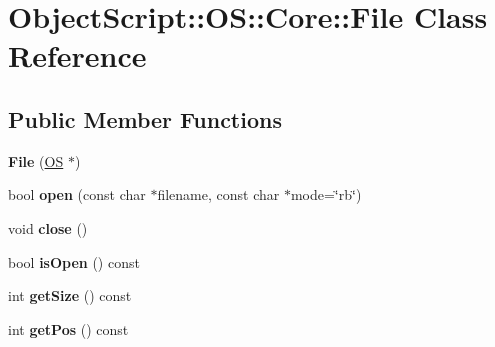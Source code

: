 \hypertarget{class_object_script_1_1_o_s_1_1_core_1_1_file}{}\section{Object\+Script\+:\+:OS\+:\+:Core\+:\+:File Class Reference}
\label{class_object_script_1_1_o_s_1_1_core_1_1_file}
\subsection*{Public Member Functions}
\begin{DoxyCompactItemize}
\item 
{\bfseries File} (\hyperlink{class_object_script_1_1_o_s}{OS} $\ast$)\hypertarget{class_object_script_1_1_o_s_1_1_core_1_1_file_a81825ddd42d586acaf70b9e6f1b3f1ba}{}\label{class_object_script_1_1_o_s_1_1_core_1_1_file_a81825ddd42d586acaf70b9e6f1b3f1ba}

\item 
bool {\bfseries open} (const char $\ast$filename, const char $\ast$mode=\char`\"{}rb\char`\"{})\hypertarget{class_object_script_1_1_o_s_1_1_core_1_1_file_a219a7ff1bf70f1fffa98cbec336a89af}{}\label{class_object_script_1_1_o_s_1_1_core_1_1_file_a219a7ff1bf70f1fffa98cbec336a89af}

\item 
void {\bfseries close} ()\hypertarget{class_object_script_1_1_o_s_1_1_core_1_1_file_a8bc6875e7e2b25e2ab4f6c4c1629a5b3}{}\label{class_object_script_1_1_o_s_1_1_core_1_1_file_a8bc6875e7e2b25e2ab4f6c4c1629a5b3}

\item 
bool {\bfseries is\+Open} () const \hypertarget{class_object_script_1_1_o_s_1_1_core_1_1_file_ab51020735a468e0050a8d3dad97038f5}{}\label{class_object_script_1_1_o_s_1_1_core_1_1_file_ab51020735a468e0050a8d3dad97038f5}

\item 
int {\bfseries get\+Size} () const \hypertarget{class_object_script_1_1_o_s_1_1_core_1_1_file_ad4825fb75d17e52c2978d4cdde539f5e}{}\label{class_object_script_1_1_o_s_1_1_core_1_1_file_ad4825fb75d17e52c2978d4cdde539f5e}

\item 
int {\bfseries get\+Pos} () const \hypertarget{class_object_script_1_1_o_s_1_1_core_1_1_file_a60466e45f0733b41400a5e14470e65c8}{}\label{class_object_script_1_1_o_s_1_1_core_1_1_file_a60466e45f0733b41400a5e14470e65c8}


\end{DoxyCompactItemize}
